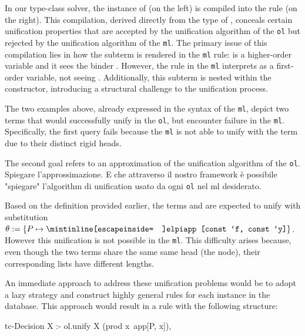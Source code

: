\documentclass[sigconf,natbib=false]{acmart}
\def\elpi{\proglang{elpi}}
\def\coq{\proglang{coq}}
\newcommand*{\acronym}[1]{\texttt{#1}\xspace}
\def\ol{\acronym{ol}} %
\def\ml{\acronym{ml}} %
\begin{document}
\noindent In our type-class solver, the  instance 
of \coq (on the left) is compiled into the \elpi rule (on the right). This 
compilation, derived
directly from the type of , conceals certain unification
properties that are accepted by the unification algorithm of the \ol but 
rejected by the unification algorithm of the \ml. The primary issue of this
compilation lies in how the subterm  is rendered in
the \ml rule:  is a higher-order variable and it
sees the binder . However, the rule in the \ml interprets  as a 
first-order variable, not seeing . Additionally, this subterm is
nested within the  constructor, introducing a structural challenge 
to the unification process.

%

\noindent The two examples above, already expressed in the syntax of the \ml,
depict two terms that would successfully unify in the \ol, but encounter failure
in the \ml. Specifically, the first query fails because the \ml is not able to unify  with the term  due to their distinct rigid heads. 

The second goal refers to an approximation of the unification algorithm of the \ol. Spiegare l'approssimazione. E che
attraverso il nostro framework è possibile "spiegare" l'algorithm di unification
usato da ogni \ol nel ml desiderato. 

Based on the definition provided earlier, the terms  and  are expected to unify with substitution $\theta := \{P
\mapsto \texttt{\elpiIn{app [const `f, const `y]}} \}$. However this unification
is not possible in the \ml. This difficulty arises because, even though 
the two terms share the same same head
(the  node), their corresponding lists have different lengths.

An immediate approach to address these unification problems
would be to adopt a lazy strategy and construct highly general rules for each instance in the database.
This approach would result in a rule with the following structure:

\begin{center}
  \begin{minipage}[c]{0.46\linewidth}
    \begin{elpicode}
      tc-Decision X :- 
        ol.unify X (prod x\ app[P, x]),
    \end{elpicode}
  \end{minipage}
\end{center}
\end{document}
